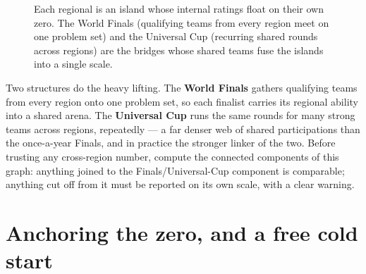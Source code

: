 \documentclass[11pt]{report}
\theoremstyle{definition}
\numberwithin{equation}{chapter}
\begin{document}
\begin{figure}[h]
\centering
{}
\caption{Each regional is an island whose internal ratings float on their own
zero. The World Finals (qualifying teams from every region meet on one problem
set) and the Universal Cup (recurring shared rounds across regions) are the
bridges whose shared teams fuse the islands into a single scale.}
\label{fig:link}
\end{figure}

Two structures do the heavy lifting. The \textbf{World Finals} gathers qualifying
teams from every region onto one problem set, so each finalist carries its
regional ability into a shared arena. The \textbf{Universal Cup} runs the same
rounds for many strong teams across regions, repeatedly --- a far denser web of
shared participations than the once-a-year Finals, and in practice the stronger
linker of the two. Before trusting any cross-region number, compute the connected
components of this graph: anything joined to the Finals/Universal-Cup component is
comparable; anything cut off from it must be reported on its own scale, with a
clear warning.

\section{Anchoring the zero, and a free cold start}
\end{document}
